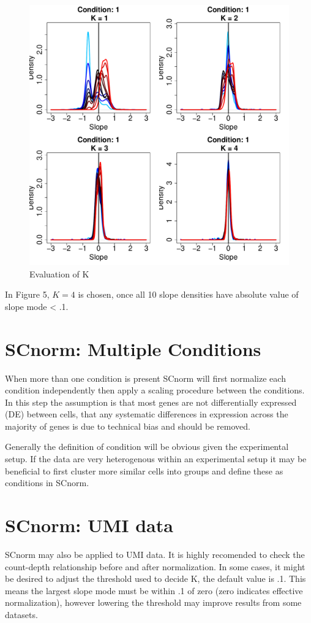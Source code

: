 \documentclass{article}
\begin{document}
\begin{figure}[h!]
\centering
\includegraphics[width=.5\textwidth]{MyNormalizedData_k_evaluation.pdf}
\caption{Evaluation of K}
\end{figure}



In Figure 5, $K = 4$ is chosen, once all 10 slope densities have absolute value of slope mode < .1.


\section{SCnorm: Multiple Conditions}
When more than one condition is present SCnorm will first normalize each condition independently then apply a scaling procedure between the conditions. In this step the assumption is that most genes are not differentially expressed (DE) between cells, that any systematic differences in expression across the majority of genes is due to technical bias and should be removed.

Generally the definition of condition will be obvious given the experimental setup. If the data are very heterogenous within an experimental setup it may be beneficial to first cluster more similar cells into groups and define these as conditions in SCnorm.

\section{SCnorm: UMI data}
SCnorm may also be applied to UMI data. It is highly recomended to check the count-depth relationship before and after normalization. In some cases, it might be desired to adjust the threshold used to decide K, the default value is .1. This means the largest slope mode must be within .1 of zero (zero indicates effective normalization), however lowering the threshold may improve results from some datasets. 
\end{document}
